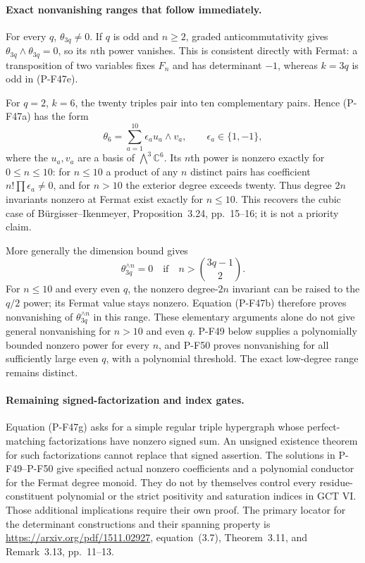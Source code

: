 \documentclass[11pt,a4paper]{article}
\begin{document}
\paragraph{Exact nonvanishing ranges that follow immediately.}
For every $q$, $\theta_{3q}\ne0$. If $q$ is odd and
$n\ge2$, graded anticommutativity gives
$\theta_{3q}\wedge\theta_{3q}=0$, so its $n$th power
vanishes. This is consistent directly with Fermat:
a transposition of two variables fixes $F_n$ and has
determinant $-1$, whereas $k=3q$ is odd in (P-F47e).

For $q=2$, $k=6$, the twenty triples pair into ten
complementary pairs. Hence (P-F47a) has the form
\[
          \theta_6=\sum_{a=1}^{10}\epsilon_a u_a\wedge v_a,
             \qquad \epsilon_a\in\{1,-1\},              \tag{P-F47h}
\]
where the $u_a,v_a$ are a basis of $\bigwedge^3\mathbb C^6$.
Its $n$th power is nonzero exactly for $0\le n\le10$:
for $n\le10$ a product of any $n$ distinct pairs has
coefficient $n!\prod\epsilon_a\ne0$, and for $n>10$
the exterior degree exceeds twenty. Thus degree $2n$
invariants nonzero at Fermat exist exactly for $n\le10$.
This recovers the cubic case of B\"urgisser--Ikenmeyer,
Proposition~3.24, pp.~15--16; it is not a priority claim.

More generally the dimension bound gives
\[
      \theta_{3q}^{\wedge n}=0
           \quad\text{if}\quad
                  n>\binom{3q-1}{2}.                   \tag{P-F47i}
\]
For $n\le10$ and every even $q$, the nonzero degree-$2n$
invariant can be raised to the $q/2$ power; its Fermat
value stays nonzero. Equation (P-F47b) therefore proves
nonvanishing of $\theta_{3q}^{\wedge n}$ in this range.
These elementary arguments alone do not give general
nonvanishing for $n>10$ and even $q$.
P-F49 below supplies a polynomially bounded nonzero
power for every $n$, and P-F50 proves nonvanishing
for all sufficiently large even $q$, with a polynomial
threshold. The exact low-degree range remains distinct.

\paragraph{Remaining signed-factorization and index gates.}
Equation (P-F47g) asks for a simple regular triple
hypergraph whose perfect-matching factorizations have
nonzero signed sum. An unsigned existence theorem for
such factorizations cannot replace that signed assertion.
The solutions in P-F49--P-F50 give specified actual
nonzero coefficients and a polynomial conductor for
the Fermat degree monoid. They do not
by themselves control every residue-constituent polynomial
or the strict positivity and saturation indices in
GCT VI. Those additional implications require their
own proof. The primary locator for the determinant
constructions and their spanning property is
\url{https://arxiv.org/pdf/1511.02927}, equation~(3.7),
Theorem~3.11, and Remark~3.13, pp.~11--13.
\end{document}
